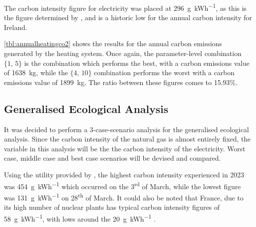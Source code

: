 The carbon intensity figure for electricity was placed at \qty{296}{\gram\per\kWh}, as this is the figure determined by \citeauthor{seai_energy_2021} \cite{seai_energy_2021}, and is a historic low for the annual carbon intensity for Ireland. 

\cref{tbl:annualheatingco2} shows the results for the annual carbon emissions generated by the heating system. Once again, the parameter-level combination $\{1\text{, }5\}$ is the combination which performs the best, with a carbon emissions value of \qty{1638}{\kilo\gram}, while the $\{4\text{, }10\}$ combination performs the worst with a carbon emissions value of \qty{1899}{\kilo\gram}. The ratio between these figures comes to 15.93\%. 

\begin{table}[htb]
    \footnotesize
    \centering
    \caption{Irish Case Study: Total annual $\text{CO}_2$ emissions from \acs{HHS} [kg]}
    \label{tbl:annualheatingco2}
\end{table}


\subsection{Generalised Ecological Analysis}
It was decided to perform a 3-case-scenario analysis for the generalised ecological analysis. Since the carbon intensity of the natural gas is almost entirely fixed, the variable in this analysis will be the the carbon intensity of the electricity. Worst case, middle case and best case scenarios will be devised and compared. 

Using the  \cite{eirgrid_group_explore_2023} utility provided by \citeauthor{eirgrid_group_explore_2023}, the highest carbon intensity experienced in 2023 was \qty{454}{\gram\per\kWh} which occurred on the 3\textsuperscript{rd} of March, while the lowest figure was \qty{131}{\gram\per\kWh} on 28\textsuperscript{th} of March. It could also be noted that France, due to its high number of nuclear plants has typical carbon intensity figures of \qty{58}{\gram\per\kWh}, with lows around the \qty{20}{\gram\per\kWh} \cite{iea2019world}.


